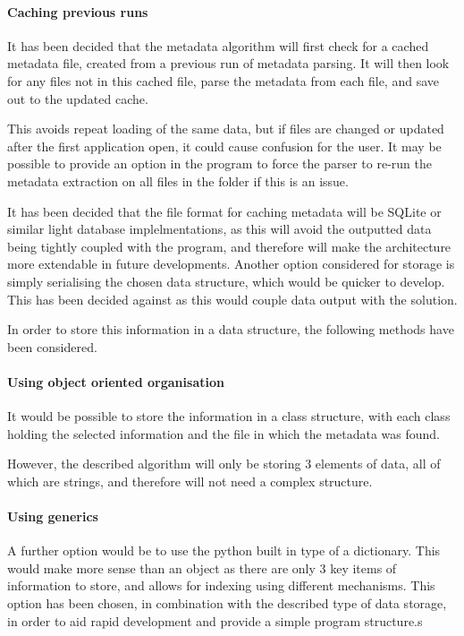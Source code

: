 \paragraph{Caching previous runs}
It has been decided that the metadata algorithm will first check for a cached metadata file, created from a previous run of metadata parsing. It will then look for any files not in this cached file, parse the metadata from each file, and save out to the updated cache.

This avoids repeat loading of the same data, but if files are changed or updated after the first application open, it could cause confusion for the user. It may be possible to provide an option in the program to force the parser to re-run the metadata extraction on all files in the folder if this is an issue.

It has been decided that the file format for caching metadata will be SQLite or similar light database implelmentations, as this will avoid the outputted data being tightly coupled with the program, and therefore will make the architecture more extendable in future developments. Another option considered for storage is simply serialising the chosen data structure, which would be quicker to develop. This has been decided against as this would couple data output with the solution.

In order to store this information in a data structure, the following methods have been considered.

\paragraph{Using object oriented organisation}
It would be possible to store the information in a class structure, with each class holding the selected information and the file in which the metadata was found.

However, the described algorithm will only be storing 3 elements of data, all of which are strings, and therefore will not need a complex structure.

\paragraph{Using generics}
A further option would be to use the python built in type of a dictionary. This would make more sense than an object as there are only 3 key items of information to store, and allows for indexing using different mechanisms. This option has been chosen, in combination with the described type of data storage, in order to aid rapid development and provide a simple program structure.s


